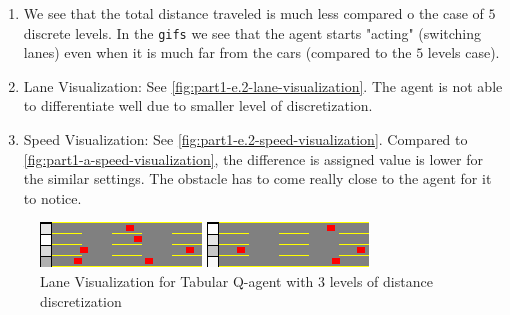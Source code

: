 \begin{enumerate}
\item We see that the total distance traveled is much less compared o the case of $5$ discrete levels. In the \texttt{gifs} we see that the agent starts "acting" (switching lanes) even when it is much far from the cars (compared to the $5$ levels case).

\item Lane Visualization: See \autoref{fig:part1-e.2-lane-visualization}. The agent is not able to differentiate well due to smaller level of discretization.
\item Speed Visualization:  See \autoref{fig:part1-e.2-speed-visualization}. Compared to \autoref{fig:part1-a-speed-visualization}, the difference is assigned value is lower for the similar settings. The obstacle has to come really close to the agent for it to notice.
\end{enumerate}

\begin{figure}[H]
    \centering
    \begin{minipage}{0.48\textwidth}
        \centering
        \includegraphics[width=\linewidth]{plots/part1-e.2-lane_visualization_00_step_0140.png}
    \end{minipage}
    \hfill
    \begin{minipage}{0.48\textwidth}
        \centering
        \includegraphics[width=\linewidth]{plots/part1-e.2-lane_visualization_00_step_0240.png}
    \end{minipage}
    \caption{Lane Visualization for Tabular Q-agent with $3$ levels of distance discretization}
    \label{fig:part1-e.2-lane-visualization}
\end{figure}

